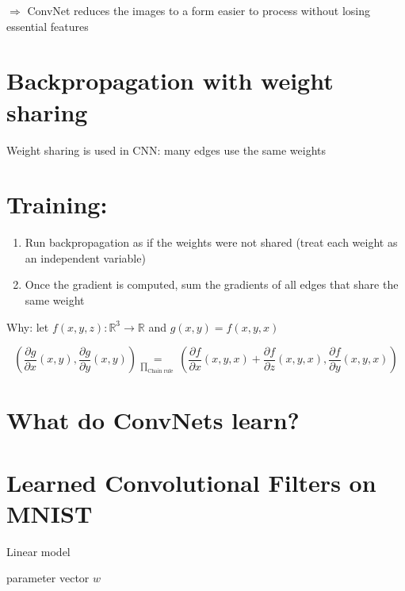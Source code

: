 \documentclass[10pt]{article}
\begin{document}
$\Rightarrow$ ConvNet reduces the images to a form easier to process without losing essential features

\section*{Backpropagation with weight sharing}
Weight sharing is used in CNN: many edges use the same weights

\section*{Training:}
\begin{enumerate}
  \item Run backpropagation as if the weights were not shared (treat each weight as an independent variable)

  \item Once the gradient is computed, sum the gradients of all edges that share the same weight

\end{enumerate}

Why: let $f(x, y, z): \mathbb{R}^{3} \rightarrow \mathbb{R}$ and $g(x, y)=f(x, y, x)$

$$
\left(\frac{\partial g}{\partial x}(x, y), \frac{\partial g}{\partial y}(x, y)\right) \underset{\prod_{\text {Chain rule }}}{=}\left(\frac{\partial f}{\partial x}(x, y, x)+\frac{\partial f}{\partial z}(x, y, x), \frac{\partial f}{\partial y}(x, y, x)\right)
$$

\section*{What do ConvNets learn?}
\section*{Learned Convolutional Filters on MNIST}
Linear model

parameter vector $w$
\end{document}
